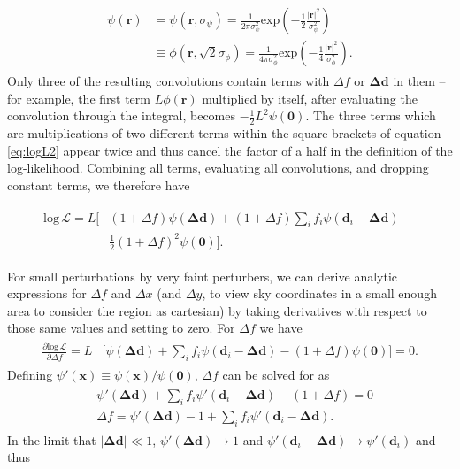 \documentclass[fleqn,usenatbib]{mnras}
\begin{document}
\begin{align}
\begin{split}
    \psi(\mathbf{r}) &= \psi(\mathbf{r}, \sigma_\psi) = \frac{1}{2\pi \sigma_\psi^2}\mathrm{exp}\left(-\frac{1}{2} \frac{\lvert\mathbf{r}\lvert^2}{\sigma_\psi^2}\right) \\&\equiv \phi(\mathbf{r}, \sqrt{2}\sigma_\phi) = \frac{1}{4\pi \sigma_\phi^2}\mathrm{exp}\left(-\frac{1}{4} \frac{\lvert\mathbf{r}\lvert^2}{\sigma_\phi^2}\right).
\end{split}
\end{align}
Only three of the resulting convolutions contain terms with $\Delta f$ or $\mathbf{\Delta d}$ in them -- for example, the first term $L\phi(\mathbf{r})$ multiplied by itself, after evaluating the convolution through the integral, becomes $-\frac{1}{2} L^2 \psi(\mathbf{0})$. The three terms which are multiplications of two different terms within the square brackets of equation \ref{eq:logL2} appear twice and thus cancel the factor of a half in the definition of the log-likelihood. Combining all terms, evaluating all convolutions, and dropping constant terms, we therefore have

\begin{align}
\begin{split}
    \mathrm{log}\,\mathcal{L} = L \bigg[&(1 + \Delta f)\psi(\mathbf{\Delta d}) + (1 + \Delta f)\sum\limits_if_i\psi(\mathbf{d}_i - \mathbf{\Delta d})\,-\\&\frac{1}{2}(1 + \Delta f)^2\psi(\mathbf{0})\Bigg].
\end{split}
\end{align}

For small perturbations by very faint perturbers, we can derive analytic expressions for $\Delta f$ and $\Delta x$ (and $\Delta y$, to view sky coordinates in a small enough area to consider the region as cartesian) by taking derivatives with respect to those same values and setting to zero. For $\Delta f$ we have
\begin{align}
\begin{split}
    \frac{\partial\mathrm{log}\,\mathcal{L}}{\partial \Delta f} = L &\bigg[\psi(\mathbf{\Delta d}) + \sum\limits_if_i\psi(\mathbf{d}_i - \mathbf{\Delta d}) - (1 + \Delta f)\psi(\mathbf{0})\bigg] = 0.
\end{split}
\end{align}
Defining $\psi{'}(\mathbf{x}) \equiv \psi(\mathbf{x})/\psi(\mathbf{0})$, $\Delta f$ can be solved for as
\begin{align}
\begin{split}
    &\psi{'}(\mathbf{\Delta d}) + \sum\limits_if_i\psi{'}(\mathbf{d}_i - \mathbf{\Delta d}) - (1 + \Delta f) = 0\\
    &\Delta f = \psi{'}(\mathbf{\Delta d}) - 1 + \sum\limits_if_i\psi{'}(\mathbf{d}_i - \mathbf{\Delta d}).
\label{eq:dfderiv}
\end{split}
\end{align}
In the limit that $\lvert\mathbf{\Delta d}\lvert \ll 1$, $\psi{'}(\mathbf{\Delta d}) \to 1$ and $\psi{'}(\mathbf{d}_i - \mathbf{\Delta d}) \to \psi{'}(\mathbf{d}_i)$ and thus
\end{document}
